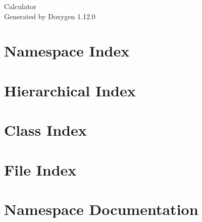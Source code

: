 \documentclass[twoside]{book}
\newcommand{\+}{\discretionary{\mbox{\scriptsize$\hookleftarrow$}}{}{}}
\newcommand{\clearemptydoublepage}{%
    \newpage{\pagestyle{empty}\cleardoublepage}%
  }
\begin{document}
  \raggedbottom
    \hypersetup{pageanchor=false,
                bookmarksnumbered=true,
                pdfencoding=unicode
               }
  \begin{titlepage}
  \vspace*{7cm}
  \begin{center}%
  {\Large Calculator}\\
  \vspace*{1cm}
  {\large Generated by Doxygen 1.12.0}\\
  \end{center}
  \end{titlepage}
  \clearemptydoublepage
  \tableofcontents
  \clearemptydoublepage
  \hypersetup{pageanchor=true}

\chapter{Namespace Index}

\chapter{Hierarchical Index}

\chapter{Class Index}

\chapter{File Index}

\chapter{Namespace Documentation}

\end{document}
